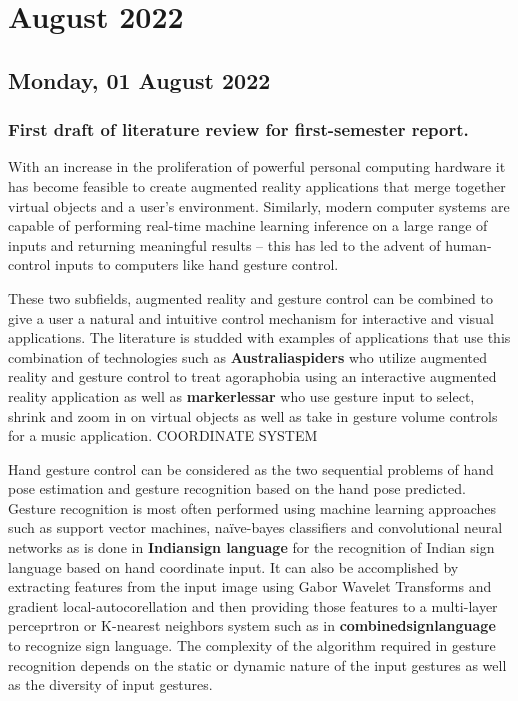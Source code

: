 \chapter[2022 August]{August 2022}

\section[2022/08/01]{Monday, 01 August 2022}
\subsection{First draft of literature review for first-semester report.}

With an increase in the proliferation of powerful personal computing hardware it has become feasible to create augmented reality applications that merge together virtual objects and a user’s environment. Similarly, modern computer systems are capable of performing real-time machine learning inference on a large range of inputs and returning meaningful results – this has led to the advent of human-control inputs to computers like hand gesture control. 

These two subfields, augmented reality and gesture control can be combined to give a user a natural and intuitive control mechanism for interactive and visual applications. The literature is studded with examples of applications that use this combination of technologies such as \textbf{Australiaspiders} who utilize augmented reality and gesture control to treat agoraphobia using an interactive augmented reality application as well as \textbf{markerlessar} who use gesture input to select, shrink and zoom in on virtual objects as well as take in gesture volume controls for a music application.  COORDINATE SYSTEM

Hand gesture control can be considered as the two sequential problems of hand pose estimation and gesture recognition based on the hand pose predicted. Gesture recognition is most often performed using machine learning approaches such as support vector machines,  naïve-bayes classifiers and convolutional neural networks as is done in \textbf{Indiansign language} for the recognition of Indian sign language based on hand coordinate input. It can also be accomplished by extracting features from the input image using Gabor Wavelet Transforms and gradient local-autocorellation and then providing those features to a multi-layer perceprtron or K-nearest neighbors system such as in \textbf{combinedsignlanguage} to recognize sign language. The complexity of the algorithm required in gesture recognition depends on the static or dynamic nature of the input gestures as well as the diversity of input gestures.

